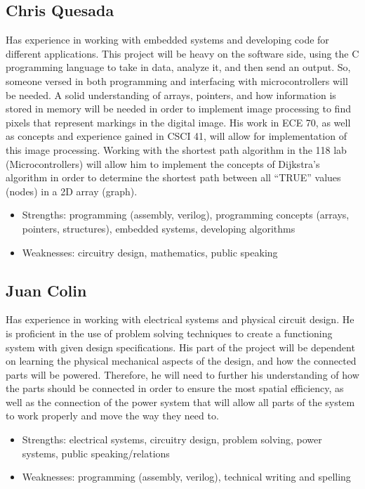  \subsection{Chris Quesada}
Has experience in working with embedded systems and developing code for different applications. This project will be heavy on the software side, using the C programming language to take in data, analyze it, and then send an output. So, someone versed in both programming and interfacing with microcontrollers will be needed. A solid understanding  of arrays, pointers, and how information is stored in memory will be needed in order to implement image processing to find pixels that represent markings in the digital image. His work in ECE 70, as well as concepts and experience gained in CSCI 41, will allow for implementation of this image processing. Working with the shortest path algorithm in the 118 lab (Microcontrollers) will allow him to implement the concepts of Dijkstra's algorithm in order to determine the shortest path between all ``TRUE'' values (nodes) in a 2D array (graph).
\begin{itemize}
	\item Strengths: programming (assembly, verilog),  programming concepts (arrays, pointers, structures), embedded systems, developing algorithms
	
	\item Weaknesses:  circuitry design, mathematics, public speaking 
\end{itemize} \par
 \subsection{Juan Colin}
  Has experience in working with electrical systems and physical circuit design. He is proficient in the use of problem solving techniques to create a functioning system with given design specifications. His part of the project will be dependent on learning the physical mechanical aspects of the design, and how the connected parts will be powered. Therefore, he will need to further his understanding of how the parts should be connected in order to ensure the most spatial efficiency, as well as the connection of the power system that will allow all parts of the system to work properly and move the way they need to.
  
	\begin{itemize}
	\item Strengths: electrical systems, circuitry design, problem solving, power systems, public speaking/relations
	\item Weaknesses: programming (assembly, verilog), technical writing and spelling \\
\end{itemize}
 
